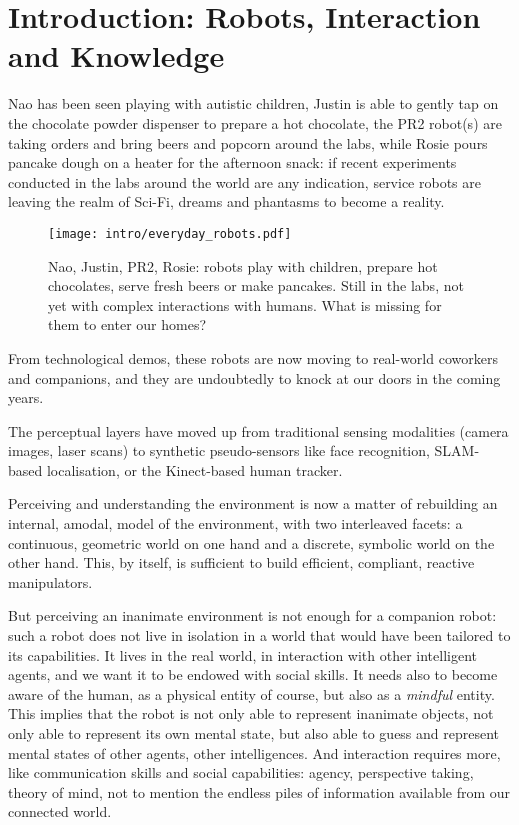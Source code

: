 \chapter{Introduction: Robots, Interaction and Knowledge}
\label{chapt|introduction}

Nao has been seen playing with autistic children, Justin is able to gently tap
on the chocolate powder dispenser to prepare a hot chocolate, the PR2 robot(s)
are taking orders and bring beers and popcorn around the labs, while Rosie
pours pancake dough on a heater for the afternoon snack: if recent experiments
conducted in the labs around the world are any indication, service robots are
leaving the realm of Sci-Fi, dreams and phantasms to become a reality.

\begin{figure}[!h]
    \centering
    \texttt{[image: intro/everyday\_robots.pdf]}

    \caption*{Nao, Justin, PR2, Rosie: robots play with children, prepare hot
    chocolates, serve fresh beers or make pancakes. Still in the labs, not
    yet with complex interactions with humans. What is missing for them to
    enter our homes?}

    \label{fig|everyday-robots}
\end{figure}

From technological demos, these robots are now moving to real-world coworkers
and companions, and they are undoubtedly to knock at our doors in the coming
years.

The perceptual layers have moved up from traditional sensing modalities (camera
images, laser scans) to synthetic pseudo-sensors like face recognition,
SLAM-based localisation, or the Kinect-based human tracker.

Perceiving and understanding the environment is now a matter of rebuilding an
internal, amodal, model of the environment, with two interleaved facets: a
continuous, geometric world on one hand and a discrete, symbolic world on the
other hand. This, by itself, is sufficient to build efficient, compliant,
reactive manipulators.

But perceiving an inanimate environment is not enough for a companion robot:
such a robot does not live in isolation in a world that would have been
tailored to its capabilities. It lives in the real world, in interaction with
other intelligent agents, and we want it to be endowed with social skills. It
needs also to become aware of the human, as a physical entity of course, but
also as a \emph{mindful} entity. This implies that the robot is not only able
to represent inanimate objects, not only able to represent its own mental
state, but also able to guess and represent mental states of other agents,
other intelligences. And interaction requires more, like communication skills
and social capabilities: agency, perspective taking, theory of mind, not to
mention the endless piles of information available from our connected
world.

